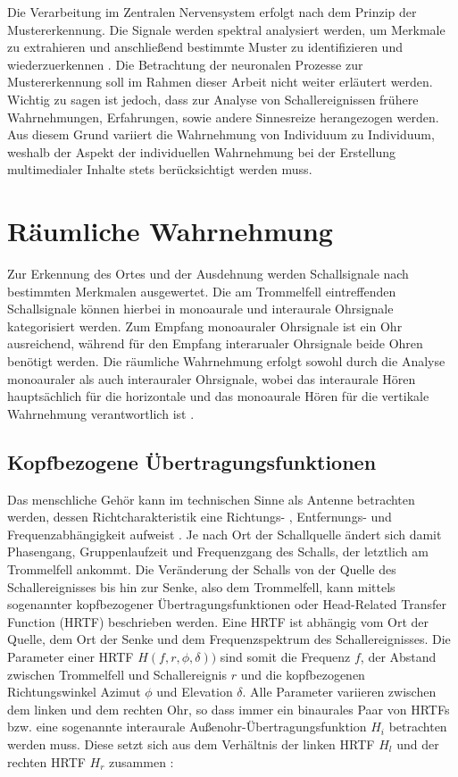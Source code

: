 Die Verarbeitung im Zentralen Nervensystem erfolgt nach dem Prinzip der Mustererkennung. Die Signale werden spektral analysiert werden, um Merkmale zu extrahieren und anschließend bestimmte Muster zu identifizieren und wiederzuerkennen \cite[S.51]{HdA08}. Die Betrachtung der neuronalen Prozesse zur Mustererkennung soll im Rahmen dieser Arbeit nicht weiter erläutert werden. Wichtig zu sagen ist jedoch, dass  zur Analyse von Schallereignissen  frühere Wahrnehmungen, Erfahrungen, sowie andere Sinnesreize herangezogen werden. Aus diesem Grund variiert die Wahrnehmung von Individuum zu Individuum, weshalb der Aspekt der individuellen Wahrnehmung bei der Erstellung multimedialer Inhalte stets berücksichtigt werden muss. 

\section{Räumliche Wahrnehmung}
Zur Erkennung des Ortes und der Ausdehnung werden Schallsignale nach bestimmten Merkmalen ausgewertet. Die am Trommelfell eintreffenden Schallsignale können hierbei in monoaurale und interaurale Ohrsignale kategorisiert werden. Zum Empfang monoauraler Ohrsignale ist ein Ohr ausreichend, während für den Empfang interarualer Ohrsignale beide Ohren benötigt werden. Die räumliche Wahrnehmung erfolgt sowohl durch die Analyse monoauraler als auch interauraler Ohrsignale, wobei das interaurale Hören hauptsächlich für die horizontale und das monoaurale Hören für die vertikale Wahrnehmung verantwortlich ist \cite[S.88]{HdA08}.\\

\subsection{Kopfbezogene Übertragungsfunktionen}

Das menschliche Gehör kann im technischen Sinne als Antenne betrachten werden, dessen Richtcharakteristik eine Richtungs- , Entfernungs-  und Frequenzabhängigkeit aufweist \cite[S.89]{HdA08}. Je nach Ort der Schallquelle ändert sich damit Phasengang, Gruppenlaufzeit und Frequenzgang des Schalls, der letztlich am Trommelfell ankommt. Die Veränderung der Schalls von der Quelle des Schallereignisses bis hin zur Senke, also dem Trommelfell, kann mittels sogenannter kopfbezogener Übertragungsfunktionen oder Head-Related Transfer Function (HRTF) beschrieben werden. Eine HRTF ist abhängig vom Ort der Quelle, dem Ort der Senke und dem Frequenzspektrum des Schallereignisses. Die Parameter einer HRTF $H(f,r,\phi,\delta))$ sind somit die Frequenz $f$, der Abstand zwischen Trommelfell und Schallereignis $r$ und die kopfbezogenen Richtungswinkel Azimut $\phi$ und Elevation $\delta$. Alle Parameter variieren zwischen dem linken und dem rechten Ohr, so dass immer ein binaurales Paar von HRTFs bzw. eine sogenannte interaurale Außenohr-Übertragungsfunktion $H_i$ betrachten werden muss. Diese setzt sich aus dem Verhältnis der linken HRTF $H_l$ und der rechten HRTF $H_r$ zusammen \cite[S.91]{HdA08}:

